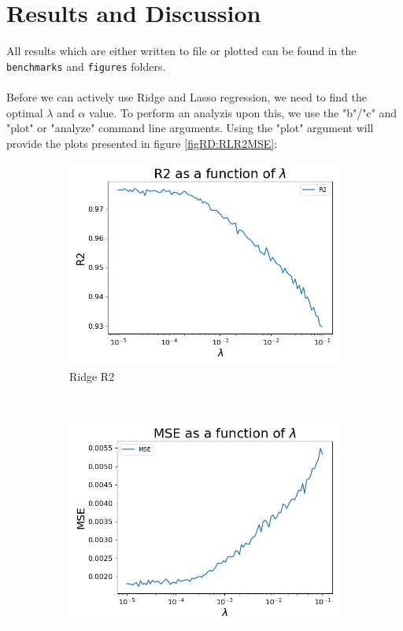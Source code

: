 \documentclass[12pt]{article}
\begin{document}
\section{Results and Discussion}  \label{s:rd}
All results which are either written to file or plotted can be found in the \texttt{benchmarks} and \texttt{figures} folders. \\ \\
Before we can actively use Ridge and Lasso regression, we need to find the optimal $\lambda$ and $\alpha$ value. To perform an analyzis upon this, we use the "b"/"c" and "plot" or "analyze" command line arguments. Using the "plot" argument will provide the plots presented in figure \ref{figRD:RLR2MSE}:
\begin{figure}[H]
\centering
\begin{subfigure}[t]{0.48\textwidth}
\includegraphics[width=\linewidth]{../figures/RidgeR2.png}
\caption{Ridge R2}
\label{figRD:RR2}
\end{subfigure}
\ \
\begin{subfigure}[t]{0.48\textwidth}
\includegraphics[width = \linewidth]{../figures/RidgeMSE.png}

\end{subfigure}
\end{figure}
\end{document}
